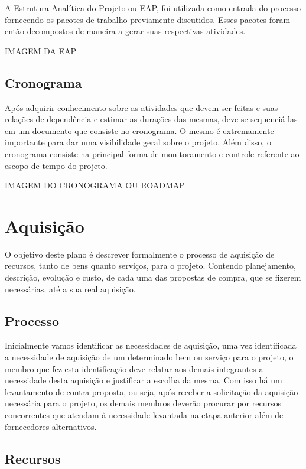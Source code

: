 A Estrutura Analítica do Projeto ou EAP, foi utilizada como entrada do processo fornecendo os pacotes de trabalho previamente discutidos. Esses pacotes foram então decompostos de maneira a gerar suas respectivas atividades.

IMAGEM DA EAP

\subsection{Cronograma}

Após adquirir conhecimento sobre as atividades que devem ser feitas e suas relações de dependência e estimar as durações das mesmas, deve-se sequenciá-las em um documento que consiste no cronograma. O mesmo é extremamente importante para dar uma visibilidade geral sobre o projeto. Além disso, o cronograma consiste na principal forma de monitoramento e controle referente ao escopo de tempo do projeto.

IMAGEM DO CRONOGRAMA OU ROADMAP

\section{Aquisição}

O objetivo deste plano é descrever formalmente o processo de aquisição de recursos, tanto de bens quanto serviços, para o projeto. Contendo planejamento, descrição, evolução e custo, de cada uma das propostas de compra, que se fizerem necessárias, até a sua real aquisição.

\subsection{Processo}

Inicialmente vamos identificar as necessidades de aquisição, uma vez identificada a necessidade de aquisição de um determinado bem ou serviço para o projeto, o membro que fez esta identificação deve relatar aos demais integrantes a necessidade desta aquisição e justificar a escolha da mesma. Com isso há um levantamento de contra proposta, ou seja, após receber a solicitação da aquisição necessária para o projeto, os demais membros deverão procurar por recursos concorrentes que atendam à necessidade levantada na etapa anterior além de fornecedores alternativos.


\subsection{Recursos}


